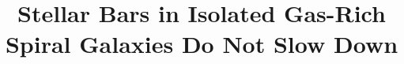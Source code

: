 \documentclass[twocolumn,linenumbers,trackchanges]{aastex631}
\begin{document}
\title{Stellar Bars in Isolated Gas-Rich Spiral Galaxies Do Not Slow Down}


\end{document}
